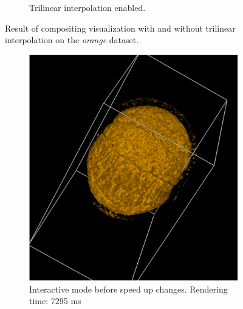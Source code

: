 \documentclass[a4paper]{article}
\begin{document}
\begin{figure}[h]
\begin{subfigure}[b]{0.45\textwidth}
    \caption{Trilinear interpolation enabled.}
  \end{subfigure}
  \caption{Result of compositing visualization with and without trilinear interpolation on the \textit{orange} dataset.}
  \label{fig:trilinear}
\end{figure}

\begin{figure}[h]
  \centering
  \begin{subfigure}[b]{0.45\textwidth}
    \centering
    \includegraphics[width=\textwidth]{before-speedup}
    \caption{Interactive mode before speed up changes. Rendering time: 7295 ms }
  \end{subfigure}
  \hfill
  \begin{subfigure}[b]{0.45\textwidth}
    \centering

\end{subfigure}
\end{figure}
\end{document}
